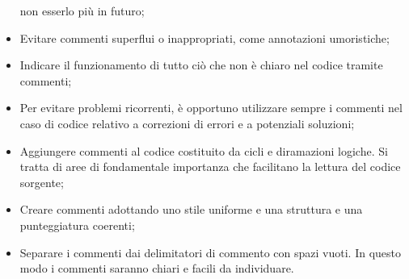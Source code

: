 \documentclass[../NormeDiProgetto.tex]{subfiles}
\begin{document}
\begin{itemize}
                        non esserlo più in futuro;
                        \item Evitare commenti superflui o inappropriati, come annotazioni umoristiche;
                        \item Indicare il funzionamento di tutto ciò che non è chiaro nel codice tramite commenti;
                        \item Per evitare problemi ricorrenti, è opportuno utilizzare sempre i commenti nel caso di codice
                        relativo a correzioni di errori e a potenziali soluzioni;
                        \item Aggiungere commenti al codice costituito da cicli e diramazioni logiche. Si tratta di aree
                        di fondamentale importanza che facilitano la lettura del codice sorgente;
                        \item Creare commenti adottando uno stile uniforme e una struttura e una punteggiatura coerenti;
                        \item Separare i commenti dai delimitatori di commento con spazi vuoti. In questo modo i
                        commenti saranno chiari e facili da individuare.
                  \end{itemize}
\end{document}
